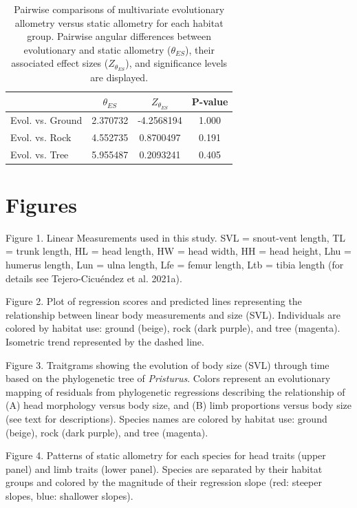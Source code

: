 \documentclass[
  11pt,
]{article}
\begin{document}
\begin{table}[H]

\caption{\label{tab:unnamed-chunk-3}Pairwise comparisons of multivariate evolutionary allometry versus static allometry for each habitat group. Pairwise angular differences between evolutionary and static allometry ($\theta_{ES}$), their associated effect sizes ($Z_{\theta_{ES}}$), and significance levels are displayed.}
\centering
\begin{tabular}[t]{lccc}
\toprule
  & $\theta_{ES}$ & $Z_{\theta_{ES}}$ & P-value\\
\midrule
Evol. vs. Ground & 2.370732 & -4.2568194 & 1.000\\
Evol. vs. Rock & 4.552735 & 0.8700497 & 0.191\\
Evol. vs. Tree & 5.955487 & 0.2093241 & 0.405\\
\bottomrule
\end{tabular}
\end{table}

\newpage

\hypertarget{figures}{%
\section{Figures}\label{figures}}

Figure 1. Linear Measurements used in this study. SVL = snout-vent
length, TL = trunk length, HL = head length, HW = head width, HH = head
height, Lhu = humerus length, Lun = ulna length, Lfe = femur length, Ltb
= tibia length (for details see Tejero-Cicuéndez et al. 2021a).

Figure 2. Plot of regression scores and predicted lines representing the
relationship between linear body measurements and size (SVL).
Individuals are colored by habitat use: ground (beige), rock (dark
purple), and tree (magenta). Isometric trend represented by the dashed
line.

Figure 3. Traitgrams showing the evolution of body size (SVL) through
time based on the phylogenetic tree of \emph{Pristurus}. Colors
represent an evolutionary mapping of residuals from phylogenetic
regressions describing the relationship of (A) head morphology versus
body size, and (B) limb proportions versus body size (see text for
descriptions). Species names are colored by habitat use: ground (beige),
rock (dark purple), and tree (magenta).

Figure 4. Patterns of static allometry for each species for head traits
(upper panel) and limb traits (lower panel). Species are separated by
their habitat groups and colored by the magnitude of their regression
slope (red: steeper slopes, blue: shallower slopes).
\end{document}
